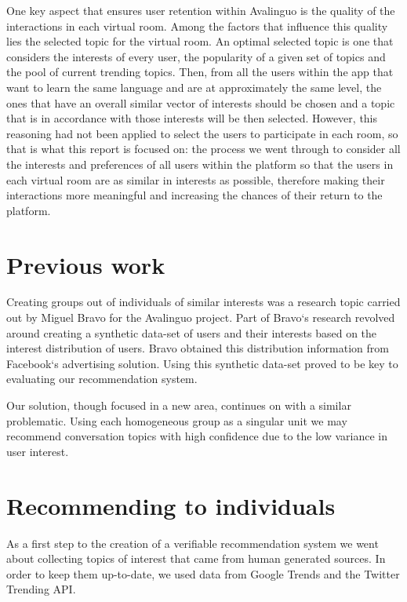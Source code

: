 \documentclass[journal]{IEEEtran}
\begin{document}
One key aspect that ensures user retention within Avalinguo is the
quality of the interactions in each virtual room. Among the factors that
influence this quality lies the selected topic for the virtual room. An
optimal selected topic is one that considers the interests of every 
user, the popularity of a given set of topics and the pool of current
trending topics. Then, from all the users within the app that want to
learn the same language and are at approximately the same level, the
ones that have an overall similar vector of interests should be chosen
and a topic that is in accordance with those interests will be then 
selected. However, this reasoning had not been applied to select the
users to participate in each room, so that is what this report is 
focused on: the process we went through to consider all the interests 
and preferences of all users within the platform so that the users in
each virtual room are as similar in interests as possible, therefore
making their interactions more meaningful and increasing the chances of
their return to the platform.


\section{Previous work}

Creating groups out of individuals of similar interests was a research
topic carried out by Miguel Bravo for the Avalinguo project. Part of
Bravo`s research revolved around creating a synthetic data-set of users
and their interests based on the interest distribution of users. Bravo
obtained this distribution information from Facebook`s advertising
solution. Using this synthetic data-set proved to be key to evaluating
our recommendation system.

Our solution, though focused in a new area, continues on with a similar
problematic. Using each homogeneous group as a singular unit we may
recommend conversation topics with high confidence due to the low
variance in user interest.


\section{Recommending to individuals}

As a first step to the creation of a verifiable recommendation system we
went about collecting topics of interest that came from human generated
sources. In order to keep them up-to-date, we used data from Google
Trends and the Twitter Trending API.
\end{document}
